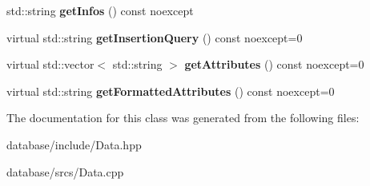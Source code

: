 \begin{DoxyCompactItemize}
\item 
\mbox{\label{classdb_1_1_data_a018e82522f3e94a76986de46116f0317}} 
std\+::string {\bfseries get\+Infos} () const noexcept
\item 
\mbox{\label{classdb_1_1_data_ad9ae1112fa992d53d1477c82c8f97b1e}} 
virtual std\+::string {\bfseries get\+Insertion\+Query} () const noexcept=0
\item 
\mbox{\label{classdb_1_1_data_ad1c1d0e75acd79d84a6e9c250179da4c}} 
virtual std\+::vector$<$ std\+::string $>$ {\bfseries get\+Attributes} () const noexcept=0
\item 
\mbox{\label{classdb_1_1_data_a79b60b9535da0748f585b0631c3d8618}} 
virtual std\+::string {\bfseries get\+Formatted\+Attributes} () const noexcept=0
\end{DoxyCompactItemize}


The documentation for this class was generated from the following files\+:\begin{DoxyCompactItemize}
\item 
database/include/Data.\+hpp\item 
database/srcs/Data.\+cpp\end{DoxyCompactItemize}
